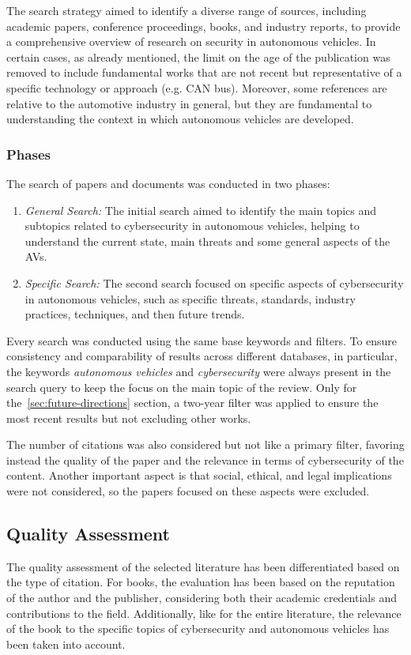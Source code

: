 The search strategy aimed to identify a diverse range of sources, including academic papers, conference proceedings, books, and industry reports, to provide a comprehensive overview of research on security in autonomous vehicles.
In certain cases, as already mentioned, the limit on the age of the publication was removed to include fundamental works that are not recent but representative of a specific technology or approach (e.g. CAN bus).
Moreover, some references are relative to the automotive industry in general, but they are fundamental to understanding the context in which autonomous vehicles are developed.

\subsubsection{Phases}\label{subsubsec:phases}
The search of papers and documents was conducted in two phases:
\begin{enumerate}
    \item \textit{General Search:} The initial search aimed to identify the main topics and subtopics related to cybersecurity in autonomous vehicles, helping to understand the current state, main threats and some general aspects of the AVs.
    \item \textit{Specific Search:} The second search focused on specific aspects of cybersecurity in autonomous vehicles, such as specific threats, standards, industry practices, techniques, and then future trends.
\end{enumerate}

Every search was conducted using the same base keywords and filters.
To ensure consistency and comparability of results across different databases, in particular, the keywords \textit{autonomous vehicles} and \textit{cybersecurity} were always present in the search query to keep the focus on the main topic of the review.
Only for the~\ref{sec:future-directions} section, a two-year filter was applied to ensure the most recent results but not excluding other works.

The number of citations was also considered but not like a primary filter, favoring instead the quality of the paper and the relevance in terms of cybersecurity of the content.
Another important aspect is that social, ethical, and legal implications were not considered, so the papers focused on these aspects were excluded.


\subsection{Quality Assessment}\label{subsec:quality-assessment}
The quality assessment of the selected literature has been differentiated based on the type of citation.
For books, the evaluation has been based on the reputation of the author and the publisher, considering both their academic credentials and contributions to the field.
Additionally, like for the entire literature, the relevance of the book to the specific topics of cybersecurity and autonomous vehicles has been taken into account.

